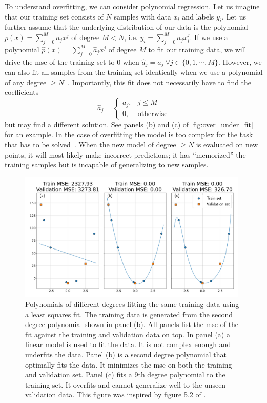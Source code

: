 To understand overfitting, we can consider polynomial regression. Let us imagine that our training set consists of $N$ samples with data $x_i$ and labels $y_i$. Let us further assume that the underlying distribution of our data is the polynomial $p(x)=\sum_{j=0}^M a_j x^j$ of degree $M < N$, i.e. $y_i=\sum_{j=0}^M a_j x_i^j$. If we use a polynomial $\hat{p}(x)=\sum_{j=0}^M \hat{a}_j x^j$ of degree $M$ to fit our training data, we will drive the \acrshort{mse} of the training set to $0$ when $\hat{a}_j = a_j\ \forall j\in\{0, 1, \cdots, M\}$. However, we can also fit all samples from the training set identically when we use a polynomial of any degree $\geq N$~\cite{Goodfellow:2016:DNN}. %
Importantly, this fit does not necessarily have to find the coefficients
\begin{equation}
\hat{a}_j =
	\begin{cases}
		a_j,& j \leq M\\
		0,& \text{otherwise}
	\end{cases}
\end{equation}
but may find a different solution. See panels (b) and (c) of \autoref{fig:over_under_fit} for an example. In the case of overfitting the model is too complex for the task that has to be solved~\cite{Goodfellow:2016:DNN}. When the new model of degree $\geq N$ is evaluated on new points, it will most likely make incorrect predictions; it has ``memorized'' the training samples but is incapable of generalizing to new samples.

\begin{figure}
	\centering
	\includegraphics[width=0.98\textwidth]{chapters/foundations/sections/ml/images/overunderfit.pdf}
	\caption[Over- and underfitting]{Polynomials of different degrees fitting the same training data using a least squares fit. The training data is generated from the second degree polynomial shown in panel (b). All panels list the \acrshort{mse} of the fit against the training and validation data on top. In panel (a) a linear model is used to fit the data. It is not complex enough and underfits the data. Panel (b) is a second degree polynomial that optimally fits the data. It minimizes the \acrshort{mse} on both the training and validation set. Panel (c) fits a 9th degree polynomial to the training set. It overfits and cannot generalize well to the unseen validation data. This figure was inspired by figure 5.2 of \cite{Goodfellow:2016:DNN}.}\label{fig:over_under_fit}
\end{figure}

